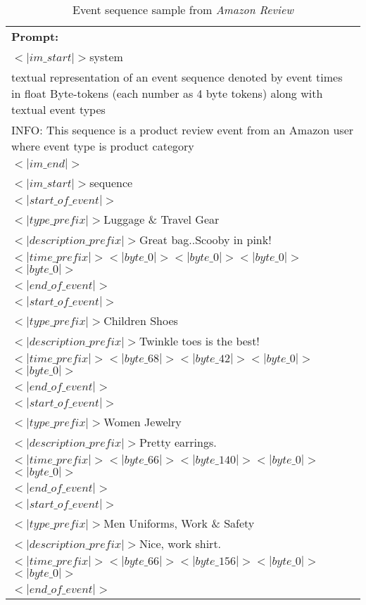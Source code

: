 \begin{table}[htb]
\small
\begin{tabular}{|p{}|}
\hline
\vspace{0.1cm}
\textbf{Prompt:} \\
$<|im\_start|>$system\\
textual representation of an event sequence denoted by event times in float Byte-tokens (each number as 4 byte tokens) along with textual event types\\
INFO: This sequence is a product review event from an Amazon user where event type is product category\\
$<|im\_end|>$\\
$<|im\_start|>$sequence\\
$<|start\_of\_event|>$\\
$<|type\_prefix|>$Luggage \& Travel Gear\\
$<|description\_prefix|>$Great bag..Scooby in pink!\\
$<|time\_prefix|>$$<|byte\_0|>$$<|byte\_0|>$$<|byte\_0|>$$<|byte\_0|>$\\
$<|end\_of\_event|>$\\
$<|start\_of\_event|>$\\
$<|type\_prefix|>$Children Shoes\\
$<|description\_prefix|>$Twinkle toes is the best!\\
$<|time\_prefix|>$$<|byte\_68|>$$<|byte\_42|>$$<|byte\_0|>$$<|byte\_0|>$\\
$<|end\_of\_event|>$\\
$<|start\_of\_event|>$\\
$<|type\_prefix|>$Women Jewelry\\
$<|description\_prefix|>$Pretty earrings.\\
$<|time\_prefix|>$$<|byte\_66|>$$<|byte\_140|>$$<|byte\_0|>$$<|byte\_0|>$\\
$<|end\_of\_event|>$\\
$<|start\_of\_event|>$\\
$<|type\_prefix|>$Men Uniforms, Work \& Safety\\
$<|description\_prefix|>$Nice, work shirt.\\
$<|time\_prefix|>$$<|byte\_66|>$$<|byte\_156|>$$<|byte\_0|>$$<|byte\_0|>$\\
$<|end\_of\_event|>$\\
\hline
\end{tabular}
\caption{Event sequence sample from \textit{Amazon Review}}\label{tab:event_sample}
\end{table}

